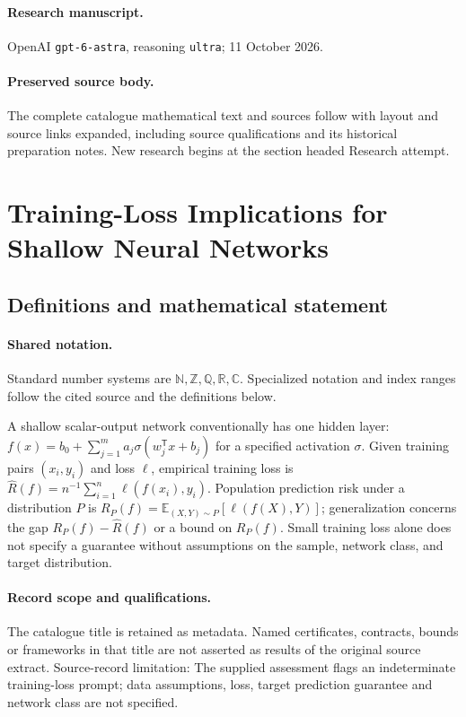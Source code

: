 \documentclass[11pt]{article}
\begin{document}
\paragraph{Research manuscript.} OpenAI \texttt{gpt-6-astra}, reasoning \texttt{ultra}; 11 October 2026.
\paragraph{Preserved source body.} The complete catalogue mathematical text and sources follow with layout and source links expanded, including source qualifications and its historical preparation notes. New research begins at the section headed Research attempt.

\section{Training-Loss Implications for Shallow Neural Networks}\label{statement}

\subsection{Definitions and mathematical statement}

\paragraph{Shared notation.}Standard number systems are $\mathbb N,\mathbb Z,\mathbb Q,\mathbb R,\mathbb C$. Specialized notation and index ranges follow the cited source and the definitions below.


A shallow scalar-output network conventionally has one hidden layer: $f(x)=b_0+\sum_{j=1}^m a_j\sigma(w_j^{\mathsf T}x+b_j)$ for a specified activation $\sigma$. Given training pairs $(x_i,y_i)$ and loss $\ell$, empirical training loss is $\widehat R(f)=n^{-1}\sum_{i=1}^n\ell(f(x_i),y_i)$. Population prediction risk under a distribution $P$ is $R_P(f)=\mathbb E_{(X,Y)\sim P}[\ell(f(X),Y)]$; generalization concerns the gap $R_P(f)-\widehat R(f)$ or a bound on $R_P(f)$. Small training loss alone does not specify a guarantee without assumptions on the sample, network class, and target distribution.
\paragraph{Record scope and qualifications.}
The catalogue title is retained as metadata. Named certificates, contracts, bounds or frameworks in that title are not asserted as results of the original source extract.
Source-record limitation: The supplied assessment flags an indeterminate training-loss prompt; data assumptions, loss, target prediction guarantee and network class are not specified.
\end{document}
